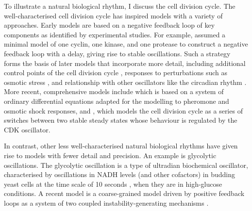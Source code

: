 To illustrate a natural biological rhythm, I discuss the cell division cycle.
The well-characterised cell division cycle has inspired models with a variety of approaches.
Early models are based on a negative feedback loop of key components as identified by experimental studies.
For example, \textcite{goldbeterMinimalCascadeModel1991} assumed a minimal model of one cyclin, one kinase, and one protease to construct a negative feedback loop with a delay, giving rise to stable oscillations.
Such a strategy forms the basis of later models that incorporate more detail, including additional control points of the cell division cycle \parencite{chenIntegrativeAnalysisCell2004}, responses to perturbations such as osmotic stress \parencite{adroverTimeDependentQuantitativeMulticomponent2011}, and relationship with other oscillators like the circadian rhythm \parencite{gerardEntrainmentMammalianCell2012, charvinForcedPeriodicExpression2009, droinLowdimensionalDynamicsTwo2019}.
More recent, comprehensive models include \textcite{adlerYeastCellCycle2022} which is based on a system of ordinary differential equations adapted for the modelling to pheromone and osmotic shock responses, and \textcite{novakMitoticKinaseOscillation2022}, which models the cell division cycle as a series of switches between two stable steady states whose behaviour is regulated by the CDK oscillator.

In contrast, other less well-characterised natural biological rhythms have given rise to models with fewer detail and precision.
An example is glycolytic oscillations.
The glycolytic oscillation is a type of ultradian biochemical oscillator, characterised by oscillations in NADH levels (and other cofactors) in budding yeast cells at the time scale of 10 seconds \parencite{doddLiveCellImaging2017, lloydSaccharomycesCerevisiaeOscillatory2019, olsenOscillationsYeastGlycolysis2021}, when they are in high-glucose conditions.
A recent model is a coarse-grained model
driven by positive feedback loops as a system of two coupled instability-generating mechanisms \parencite{goldbeterMultisynchronizationOtherPatterns}.

